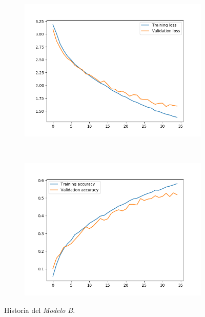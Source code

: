 \documentclass[11pt,a4paper]{article}
\begin{document}
\begin{figure}[H]
  \centering
  \begin{subfigure}{.5\textwidth}
    \includegraphics[scale=0.4]{img/deep2-drop-loss-35.png}
    \label{fig:deep2-drop-loss-35}
  \end{subfigure}%
  ~ \quad
  \begin{subfigure}{.5\textwidth}
    \includegraphics[scale=0.4]{img/deep2-drop-acc-35.png}
    \label{fig:deep2-drop-acc-35}
  \end{subfigure}
  \caption{Historia del \textit{Modelo B}.}
  \label{fig:history-deep2-drop-35}
\end{figure}
\end{document}
